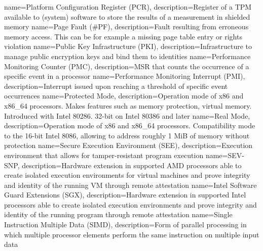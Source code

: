 %
{
  name=Platform Configuration Register (PCR),
  description={Register of a TPM available to (system) software to store the results of a measurement in shielded
  memory}
}
{
  name=Page Fault (\#PF),
  description={Fault resulting from erroneous memory access. This can be for example a missing page table entry or
  rights violation}
}
{
  name=Public Key Infrastructure (PKI),
  description={Infrastructure to manage public encryption keys and bind them to identities}
}
{
  name=Performance Monitoring Counter (PMC),
  description={MSR that counts the occurrence of a specific event in a processor}
}
{
  name=Performance Monitoring Interrupt (PMI),
  description={Interrupt issued upon reaching a threshold of specific event occurrences}
}
{
  name=Protected Mode,
  description={Operation mode of x86 and x86\_64 processors. Makes features such as memory protection, virtual memory.
  Introduced with Intel 80286. 32-bit on Intel 80386 and later}
}
%
{
  name=Real Mode,
  description={Operation mode of x86 and x86\_64 processors. Compatibility mode to the 16-bit Intel 8086, allowing to
  address roughly 1 MiB of memory without protection}
}
%
{
  name=Secure Execution Environment (SEE),
  description={Execution environment that allows for tamper-resistant program execution}
}
{
  name=SEV-SNP,
  description={Hardware extension in supported AMD processors able to create isolated execution environments for
  virtual machines and prove integrity and identity of the running VM through remote attestation}
}
{
  name=Intel Software Guard Extensions (SGX),
  description={Hardware extension in supported Intel processors able to create isolated execution environments and
  prove integrity and identity of the running program through remote attestation}
}
{
  name=Single Instruction Multiple Data (SIMD),
  description={Form of parallel processing in which multiple processor elements perform the same instruction on
  multiple input data}
}
